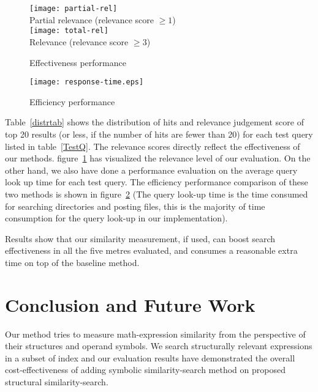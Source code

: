 \begin{figure}
\begin{center}
\texttt{[image: partial-rel]}
\\Partial relevance (relevance score $\ge 1$)
\\[0.4in]
\texttt{[image: total-rel]}
\\ Relevance (relevance score $\ge 3$)
\end{center}
\caption{Effectiveness performance}\label{perfcomp}
\end{figure}

\begin{figure}
\begin{center}
\texttt{[image: response-time.eps]}
\end{center}
\caption{Efficiency performance}\label{effiperf}
\end{figure}

Table~\ref{distrtab} shows the distribution of hits and relevance judgement score of top 20 results (or less, if the number of hits are fewer than 20) for each test query listed in table~\ref{TestQ}.
The relevance scores directly reflect the effectiveness of our methods.
figure~\ref{perfcomp} has visualized the relevance level of our evaluation.
On the other hand,
we also have done a performance evaluation on the average query look up time for each test query.
The efficiency performance comparison of these two methods is shown in figure~\ref{effiperf} 
(The query look-up time is the time consumed for searching directories and posting files, this is the majority of time consumption for the query look-up in our implementation).

Results show that our similarity measurement, if used, can boost search effectiveness in all the five metres evaluated, 
and consumes a reasonable extra time on top of the baseline method. 

\section{Conclusion and Future Work}
Our method tries to measure math-expression similarity from the perspective of their structures and operand symbols. 
We search structurally relevant expressions in a subset of index and our evaluation results have demonstrated the overall cost-effectiveness of adding symbolic similarity-search method on proposed structural similarity-search.

